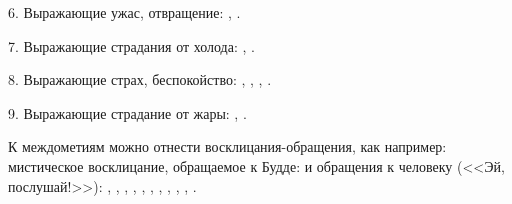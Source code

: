 6. Выражающие ужас, отвращение:
,
.

7. Выражающие страдания от холода:
,
.

8. Выражающие страх, беспокойство:
,
,
,
.

9. Выражающие страдание от жары:
,
.

К междометиям можно отнести восклицания-обращения, как например: мистическое восклицание, обращаемое к Будде:  и обращения к человеку (<<Эй, послушай!>>):
,
,
,
,
,
,
,
,
,
,
.
